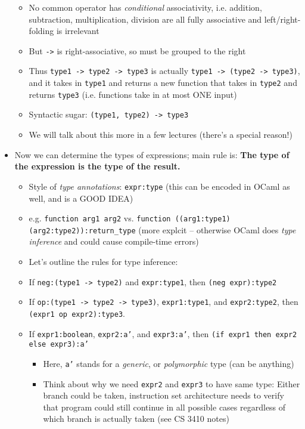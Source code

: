 \begin{itemize}
\begin{itemize}
        \item No common operator has \textit{conditional} associativity, i.e. addition, subtraction, multiplication, division are all fully associative and left/right-folding is irrelevant
        \item But \texttt{->} is right-associative, so must be grouped to the right
        \item Thus \texttt{type1 -> type2 -> type3} is actually \texttt{type1 -> (type2 -> type3)}, and it takes in \texttt{type1} and returns a new function that takes in \texttt{type2} and returns \texttt{type3} (i.e. functions take in at most ONE input)
        \item Syntactic sugar: \texttt{(type1, type2) -> type3}
        \item We will talk about this more in a few lectures (there's a special reason!)
    \end{itemize}
    \item Now we can determine the types of expressions; main rule is: \textbf{The type of the expression is the type of the result.}
    \begin{itemize}
        \item Style of \textit{type annotations}: \texttt{expr:type} (this can be encoded in \textsf{OCaml} as well, and is a GOOD IDEA)
        \item e.g. \texttt{function arg1 arg2} vs. \texttt{function ((arg1:type1) (arg2:type2)):return\_type} (more explcit -- otherwise \textsf{OCaml} does \textit{type inference} and could cause compile-time errors)
        \item Let's outline the rules for type inference:
        \item If \texttt{neg:(type1 -> type2)} and \texttt{expr:type1}, then \texttt{(neg expr):type2}
        \item If \texttt{op:(type1 -> type2 -> type3)}, \texttt{expr1:type1}, and \texttt{expr2:type2}, then \texttt{(expr1 op expr2):type3}.
        \item If \texttt{expr1:boolean}, \texttt{expr2:a'}, and \texttt{expr3:a'}, then \lstinline{(if expr1 then expr2 else expr3)}\texttt{:a'}
        \begin{itemize}
            \item Here, \texttt{a'} stands for a \textit{generic}, or \textit{polymorphic} type (can be anything)
            \item Think about why we need \texttt{expr2} and \texttt{expr3} to have same type: Either branch could be taken, instruction set architecture needs to verify that program could still continue in all possible cases regardless of which branch is actually taken (see CS 3410 notes)

\end{itemize}
\end{itemize}
\end{itemize}
